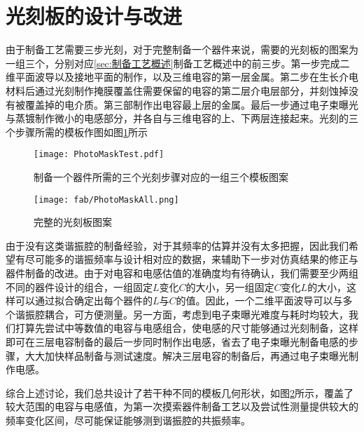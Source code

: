             




        \section{光刻板的设计与改进} %
        \label{sec:光刻板的设计}

            由于制备工艺需要三步光刻，对于完整制备一个器件来说，需要的光刻板的图案为一组三个，分别对应\ref{sec:制备工艺概述}制备工艺概述中的前三步。第一步完成二维平面波导以及接地平面的制作，以及三维电容的第一层金属。第二步在生长介电材料后通过光刻制作掩膜覆盖住需要保留的电容的第二层介电层部分，并刻蚀掉没有被覆盖掉的电介质。第三部制作出电容最上层的金属。最后一步通过电子束曝光与蒸镀制作微小的电感部分，并各自与三维电容的上、下两层连接起来。光刻的三个步骤所需的模板作图如图\ref{fig:one_group}所示
            

            \begin{figure}[h]
                \centering
                \texttt{[image: PhotoMaskTest.pdf]}
                \caption{制备一个器件所需的三个光刻步骤对应的一组三个模板图案}
                \label{fig:one_group}
            \end{figure}

            \begin{figure}[h]
                \centering
                \texttt{[image: fab/PhotoMaskAll.png]}
                \caption{完整的光刻板图案}
                \label{fig:LC}
            \end{figure}

            由于没有这类谐振腔的制备经验，对于其频率的估算并没有太多把握，因此我们希望有尽可能多的谐振频率与设计相对应的数据，来辅助下一步对仿真结果的修正与器件制备的改进。由于对电容和电感估值的准确度均有待确认，我们需要至少两组不同的器件设计的组合，一组固定$L$变化$C$的大小，另一组固定$C$变化$L$的大小，这样可以通过拟合确定出每个器件的$L$与$C$的值。因此，一个二维平面波导可以与多个谐振腔耦合，可方便测量。另一方面，考虑到电子束曝光难度与耗时均较大，我们打算先尝试中等数值的电容与电感组合，使电感的尺寸能够通过光刻制备，这样即可在三层电容制备的最后一步同时制作出电感，省去了电子束曝光制备电感的步骤，大大加快样品制备与测试速度。解决三层电容的制备后，再通过电子束曝光制作电感。

            综合上述讨论，我们总共设计了若干种不同的模板几何形状，如图\ref{fig:LC}所示，覆盖了较大范围的电容与电感值，为第一次摸索器件制备工艺以及尝试性测量提供较大的频率变化区间，尽可能保证能够测到谐振腔的共振频率。





